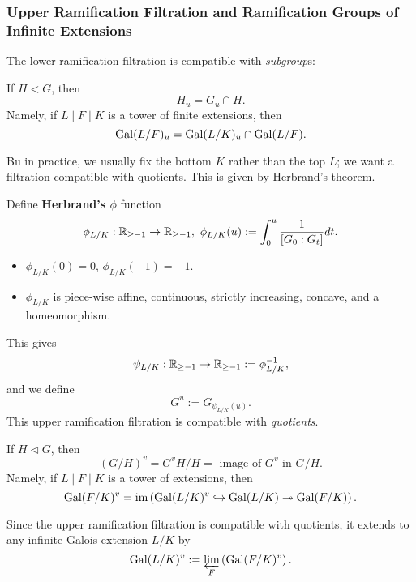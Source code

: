 \subsubsection{Upper Ramification Filtration and Ramification Groups of Infinite Extensions}

The lower ramification filtration is compatible with \textit{subgroup}s:
\begin{proposition}
    If $H < G$, then \[H_u = G_u\cap H.\]
    Namely, if $L\mid F\mid K$ is a tower of finite extensions,
    then \[\operatorname{Gal}(L/F)_u = \operatorname{Gal}(L/K)_u\cap \operatorname{Gal}(L/F).\]
\end{proposition}

Bu in practice, we usually fix the bottom $K$ rather than the top $L$; we want a filtration compatible with quotients.
This is given by Herbrand's theorem.

Define \textbf{Herbrand's $\phi$} function\[\phi_{L/K} :\mathbb{R}_{\ge -1}\to\mathbb{R}_{\ge -1},\ \phi_{L/K}(u) := \int_0^u \frac{1}{[G_0 : G_t]}dt.\]
\begin{itemize}
    \item $\phi_{L/K}(0) = 0$, $\phi_{L/K}(-1) = -1$.
    \item $\phi_{L/K}$ is piece-wise affine, continuous, strictly increasing, concave, and a homeomorphism.
\end{itemize}
This gives \[\psi_{L/K} : \mathbb{R}_{\ge -1}\to\mathbb{R}_{\ge -1} := \phi_{L/K}^{-1},\]
and we define \[G^u := G_{\psi_{L/K}(u)}.\]
This upper ramification filtration is compatible with \textit{quotients}.
\begin{theorem}
    If $H\vartriangleleft G$,
    then \[(G/H)^v = G^vH/H = \text{ image of }G^v\text{ in }G/H.\]
    Namely, if $L\mid F\mid K$ is a tower of extensions,
    then \[\operatorname{Gal}(F/K)^v = \operatorname{im}\left( \operatorname{Gal}(L/K)^v\hookrightarrow\operatorname{Gal}(L/K)\twoheadrightarrow\operatorname{Gal}(F/K) \right).\]
\end{theorem}
Since the upper ramification filtration is compatible with quotients,
it extends to any infinite Galois extension $L/K$ by
\[\operatorname{Gal}(L/K)^v := \varprojlim_F\left( \operatorname{Gal}(F/K)^v \right).\]



